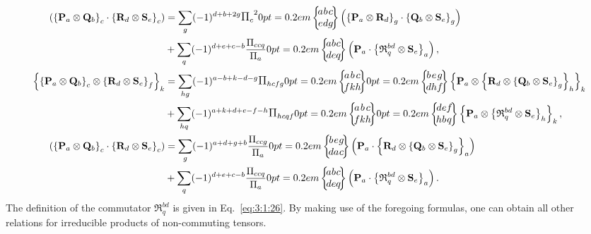 \begin{align}
 \left(\left\{\vect{P}_{a} \otimes \vect{Q}_{b}\right\}_{c} \cdot\left\{\vect{R}_{d} \otimes \vect{S}_{e}\right\}_{c}\right)&=\sum_{g}(-1)^{d+b+2 g} \Fact{c}^{2}\sixj{a }{ b }{ c }{e }{ d }{ g}\left(\left\{\vect{P}_{a} \otimes \vect{R}_{d}\right\}_{g} \cdot\left\{\vect{Q}_{b} \otimes \vect{S}_{e}\right\}_{g}\right)  \notag\\
& +\sum_{q}(-1)^{d+e+c-b} \frac{\Fact{c c q}}{\Fact{a}}\sixj{a }{ b }{ c }{d }{ e }{ q}\left(\vect{P}_{a} \cdot\left\{\mathfrak{R}_{q}^{b d} \otimes \vect{S}_{e}\right\}_{a}\right),  \label{eq:3:3:21}\\
 \left\{\left\{\vect{P}_{a} \otimes \vect{Q}_{b}\right\}_{c} \otimes\left\{\vect{R}_{d} \otimes \vect{S}_{e}\right\}_{f}\right\}_{k}&=\sum_{h g}(-1)^{a-b+k-d-g} \Fact{h c f g}\sixj{a }{ b }{ c }{f }{ k }{ h}\sixj{b }{ e }{ g }{d }{ h }{ f}\left\{\vect{P}_{a} \otimes\left\{\vect{R}_{d} \otimes\left\{\vect{Q}_{b} \otimes \vect{S}_{e}\right\}_{g}\right\}_{h}\right\}_{k}  \notag\\
& +\sum_{h q}(-1)^{a+k+d+e-f-h} \Fact{h c q f}\sixj{a }{ b }{ c }{f }{ k }{ h}\sixj{d }{ e }{ f }{h }{ b }{ q}\left\{\vect{P}_{a} \otimes\left\{\mathfrak{R}_{q}^{b d} \otimes \vect{S}_{e}\right\}_{h}\right\}_{k},  \label{eq:3:3:22}\\
 \left(\left\{\vect{P}_{a} \otimes \vect{Q}_{b}\right\}_{c} \cdot\left\{\vect{R}_{d} \otimes \vect{S}_{e}\right\}_{c}\right)&=\sum_{g}(-1)^{a+d+g+b} \frac{\Fact{c c g}}{\Fact{a}}\sixj{b }{ e }{ g }{d }{ a }{ c}\left(\vect{P}_{a} \cdot\left\{\vect{R}_{d} \otimes\left\{\vect{Q}_{b} \otimes \vect{S}_{e}\right\}_{g}\right\}_{a}\right)  \notag\\
& +\sum_{q}(-1)^{d+e+c-b} \frac{\Fact{c c q}}{\Fact{a}}\sixj{a }{ b }{ c }{d }{ e }{ q}\left(\vect{P}_{a} \cdot\left\{\mathfrak{R}_{q}^{b d} \otimes \vect{S}_{e}\right\}_{a}\right) . \label{eq:3:3:23}
\end{align}
The definition of the commutator $\mathfrak{R}_{q}^{b d}$ is given in Eq.~\eqref{eq:3:1:26}. By making use of the foregoing formulas, one can obtain all other relations for irreducible products of non-commuting tensors.

